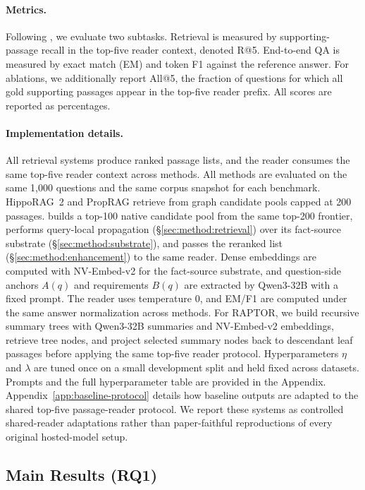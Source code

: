 \paragraph{Metrics.}
Following \citet{gutierrez2025hipporag}, we evaluate two subtasks.
Retrieval is measured by supporting-passage recall in the top-five
reader context, denoted R@5. End-to-end QA is measured by exact match
(EM) and token F1 against the reference answer. For ablations, we
additionally report All@5, the fraction of questions for which all
gold supporting passages appear in the top-five reader prefix. All
scores are reported as percentages.

\paragraph{Implementation details.}
All retrieval systems produce ranked passage lists, and the reader
consumes the same top-five reader context across methods. All methods
are evaluated on the same 1{,}000 questions and the same corpus
snapshot for each benchmark. HippoRAG~2 and PropRAG retrieve from graph
candidate pools capped at 200 passages.
\methodname{} builds a top-100 native candidate pool from the same
top-200 frontier, performs query-local propagation
(\S\ref{sec:method:retrieval}) over its fact-source substrate
(\S\ref{sec:method:substrate}), and passes the reranked list
(\S\ref{sec:method:enhancement}) to the same reader. Dense embeddings
are computed with NV-Embed-v2 for the fact-source substrate, and
question-side anchors $A(q)$ and requirements $B(q)$ are extracted by
Qwen3-32B with a fixed prompt. The reader uses temperature 0, and
EM/F1 are computed under the same answer normalization across methods.
For RAPTOR, we build recursive summary trees with Qwen3-32B summaries
and NV-Embed-v2 embeddings, retrieve tree nodes, and project selected
summary nodes back to descendant leaf passages before applying the same
top-five reader protocol.
Hyperparameters $\eta$ and $\lambda$ are tuned once on a small
development split and held fixed across datasets. Prompts and the full
hyperparameter table are provided in the Appendix.
Appendix~\ref{app:baseline-protocol} details how baseline outputs are
adapted to the shared top-five passage-reader protocol.
We report these systems as controlled shared-reader adaptations rather
than paper-faithful reproductions of every original hosted-model setup.

\subsection{Main Results (RQ1)}
\label{sec:experiments:main}


